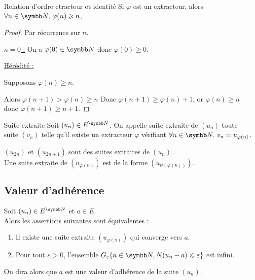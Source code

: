 \begin{proposition}{Relation d'ordre etracteur et identité}{}
    Si $\varphi$ est un extracteur, alors $\forall n \in \N, \, \varphi(n) \geqslant n$.
\end{proposition}


\begin{proof}
    Par récurrence sur $n$. 

    \uline{$n = 0$ :}
    On a $\varphi(0) \in \N$ donc $\varphi(0) \geqslant 0$.

    \uline{Hérédité :}

    Supposons $\varphi(n) \geqslant n$.

    Alors $\varphi(n + 1) > \varphi(n) \geqslant n$ 
    Donc $\varphi(n + 1) \geqslant \varphi(n) + 1$, or $\varphi(n) \geqslant n$ donc
    $\varphi(n + 1) \geqslant n + 1$.
\end{proof}

\begin{definition}{Suite extraite}{}
    Soit $(u_n) \in E^{\N}$. On appelle suite extraite de $(u_n)$ toute suite 
    $(v_n)$ telle qu'il existe un extracteur $\varphi$ vérifiant 
    $\forall n \in \N, \, v_n = u_{\varphi(n)}$.
\end{definition}

\begin{exemple}
    $(u_{2n})$ et $(u_{2n + 1})$ sont des suites extraites de $(u_n)$. \\

    Une suite extraite de $(u_{\varphi(n)})$ est de la forme $(u_{\psi (\varphi (n))})$.
\end{exemple}

\subsection{Valeur d'adhérence}

\begin{theoreme}{}{}
    Soit $(u_n) \in E^{\N}$ et $a \in E$. \\

    Alors les assertions suivantes sont équivalentes :
    \begin{enumerate}
        \item Il existe une suite extraite $(u_{\varphi(n)})$ qui converge 
            vers $a$.
        \item Pour tout $\varepsilon > 0$, l'ensemble 
            $G_\varepsilon\{n \in \N, N(u_n - a) \leqslant \varepsilon\}$ est infini.
    \end{enumerate}

    On dira alors que $a$ est une valeur d'adhérence de la suite $(u_n)$.
\end{theoreme}

